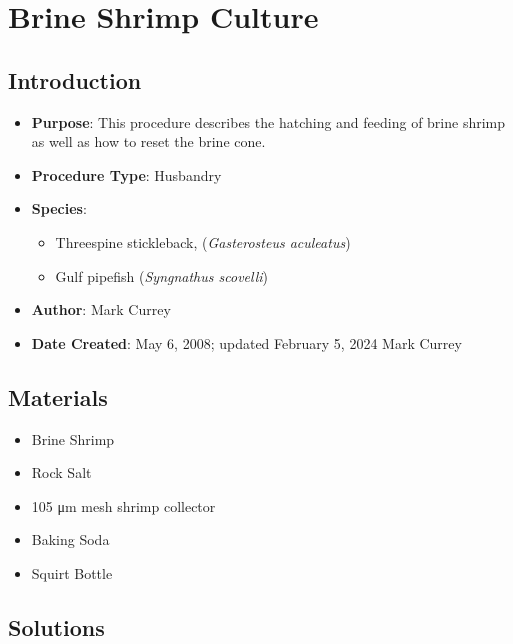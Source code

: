 \documentclass[
  letterpaper,
  DIV=11,
  numbers=noendperiod]{scrreprt}
\providecommand{\tightlist}{%
  \setlength{\itemsep}{0pt}\setlength{\parskip}{0pt}}\usepackage{longtable,booktabs,array}
\begin{document}
\hypertarget{sec-husbandry-brine_gen_hatch_feed}{%
\chapter{Brine Shrimp
Culture}\label{sec-husbandry-brine_gen_hatch_feed}}

\hypertarget{introduction-41}{%
\section{Introduction}\label{introduction-41}}

\begin{itemize}
\tightlist
\item
  \textbf{Purpose}: This procedure describes the hatching and feeding of
  brine shrimp as well as how to reset the brine cone.
\item
  \textbf{Procedure Type}: Husbandry
\item
  \textbf{Species}:

  \begin{itemize}
  \tightlist
  \item
    Threespine stickleback, (\emph{Gasterosteus aculeatus})
  \item
    Gulf pipefish (\emph{Syngnathus scovelli})
  \end{itemize}
\item
  \textbf{Author}: Mark Currey
\item
  \textbf{Date Created}: May 6, 2008; updated February 5, 2024 Mark
  Currey
\end{itemize}

\hypertarget{materials-39}{%
\section{Materials}\label{materials-39}}

\begin{itemize}
\tightlist
\item
  Brine Shrimp
\item
  Rock Salt
\item
  105 μm mesh shrimp collector
\item
  Baking Soda
\item
  Squirt Bottle
\end{itemize}

\hypertarget{solutions-31}{%
\section{Solutions}\label{solutions-31}}
\end{document}

